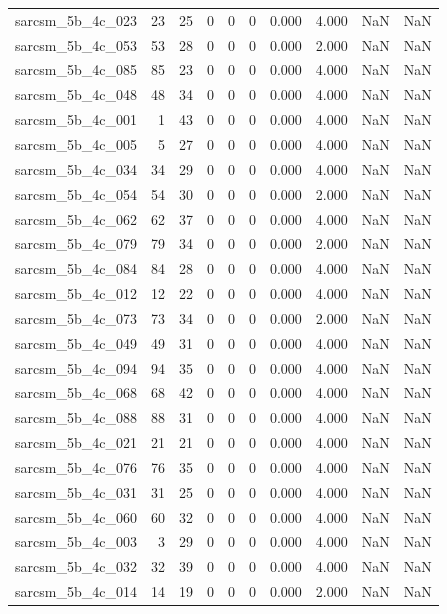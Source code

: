 \documentclass{article}
\begin{document}
\begin{longtable}{lrrrrrrrrr}
sarcsm\_5b\_4c\_023 & 23 & 25 & 0 & 0 & 0 & 0.000 & 4.000 & NaN & NaN \\
sarcsm\_5b\_4c\_053 & 53 & 28 & 0 & 0 & 0 & 0.000 & 2.000 & NaN & NaN \\
sarcsm\_5b\_4c\_085 & 85 & 23 & 0 & 0 & 0 & 0.000 & 4.000 & NaN & NaN \\
sarcsm\_5b\_4c\_048 & 48 & 34 & 0 & 0 & 0 & 0.000 & 4.000 & NaN & NaN \\
sarcsm\_5b\_4c\_001 & 1 & 43 & 0 & 0 & 0 & 0.000 & 4.000 & NaN & NaN \\
sarcsm\_5b\_4c\_005 & 5 & 27 & 0 & 0 & 0 & 0.000 & 4.000 & NaN & NaN \\
sarcsm\_5b\_4c\_034 & 34 & 29 & 0 & 0 & 0 & 0.000 & 4.000 & NaN & NaN \\
sarcsm\_5b\_4c\_054 & 54 & 30 & 0 & 0 & 0 & 0.000 & 2.000 & NaN & NaN \\
sarcsm\_5b\_4c\_062 & 62 & 37 & 0 & 0 & 0 & 0.000 & 4.000 & NaN & NaN \\
sarcsm\_5b\_4c\_079 & 79 & 34 & 0 & 0 & 0 & 0.000 & 2.000 & NaN & NaN \\
sarcsm\_5b\_4c\_084 & 84 & 28 & 0 & 0 & 0 & 0.000 & 4.000 & NaN & NaN \\
sarcsm\_5b\_4c\_012 & 12 & 22 & 0 & 0 & 0 & 0.000 & 4.000 & NaN & NaN \\
sarcsm\_5b\_4c\_073 & 73 & 34 & 0 & 0 & 0 & 0.000 & 2.000 & NaN & NaN \\
sarcsm\_5b\_4c\_049 & 49 & 31 & 0 & 0 & 0 & 0.000 & 4.000 & NaN & NaN \\
sarcsm\_5b\_4c\_094 & 94 & 35 & 0 & 0 & 0 & 0.000 & 4.000 & NaN & NaN \\
sarcsm\_5b\_4c\_068 & 68 & 42 & 0 & 0 & 0 & 0.000 & 4.000 & NaN & NaN \\
sarcsm\_5b\_4c\_088 & 88 & 31 & 0 & 0 & 0 & 0.000 & 4.000 & NaN & NaN \\
sarcsm\_5b\_4c\_021 & 21 & 21 & 0 & 0 & 0 & 0.000 & 4.000 & NaN & NaN \\
sarcsm\_5b\_4c\_076 & 76 & 35 & 0 & 0 & 0 & 0.000 & 4.000 & NaN & NaN \\
sarcsm\_5b\_4c\_031 & 31 & 25 & 0 & 0 & 0 & 0.000 & 4.000 & NaN & NaN \\
sarcsm\_5b\_4c\_060 & 60 & 32 & 0 & 0 & 0 & 0.000 & 4.000 & NaN & NaN \\
sarcsm\_5b\_4c\_003 & 3 & 29 & 0 & 0 & 0 & 0.000 & 4.000 & NaN & NaN \\
sarcsm\_5b\_4c\_032 & 32 & 39 & 0 & 0 & 0 & 0.000 & 4.000 & NaN & NaN \\
sarcsm\_5b\_4c\_014 & 14 & 19 & 0 & 0 & 0 & 0.000 & 2.000 & NaN & NaN \\

\end{longtable}
\end{document}
